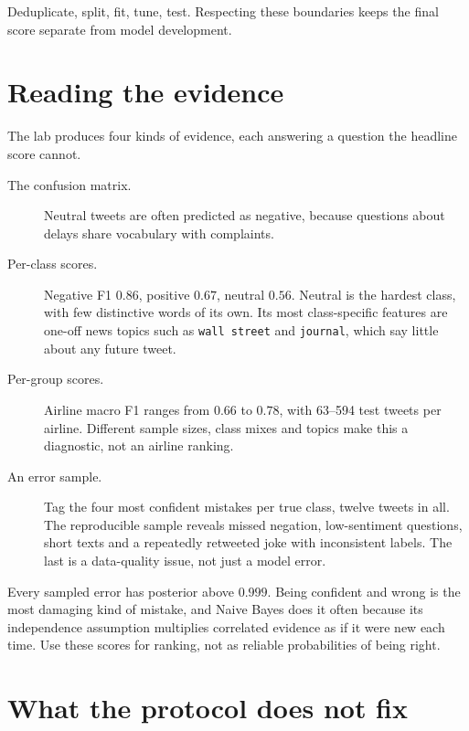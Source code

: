 \begin{keyidea}
Deduplicate, split, fit, tune, test. Respecting these boundaries keeps the final score separate from model development.
\end{keyidea}

\section{Reading the evidence}

The lab produces four kinds of evidence, each answering a question the headline score cannot.

\begin{description}
  \item[The confusion matrix.] Neutral tweets are often predicted as negative, because questions about delays share vocabulary with complaints.
  \item[Per-class scores.] Negative F1 $0.86$, positive $0.67$, neutral $0.56$. Neutral is the hardest class, with few distinctive words of its own. Its most class-specific features are one-off news topics such as \texttt{wall street} and \texttt{journal}, which say little about any future tweet.
  \item[Per-group scores.] Airline macro F1 ranges from $0.66$ to $0.78$, with 63--594 test tweets per airline. Different sample sizes, class mixes and topics make this a diagnostic, not an airline ranking.
  \item[An error sample.] Tag the four most confident mistakes per true class, twelve tweets in all. The reproducible sample reveals missed negation, low-sentiment questions, short texts and a repeatedly retweeted joke with inconsistent labels. The last is a data-quality issue, not just a model error.
\end{description}

\begin{pitfall}
Every sampled error has posterior above $0.999$. Being confident and wrong is the most damaging kind of mistake, and Naive Bayes does it often because its independence assumption multiplies correlated evidence as if it were new each time. Use these scores for ranking, not as reliable probabilities of being right.
\end{pitfall}

\section{What the protocol does not fix}

